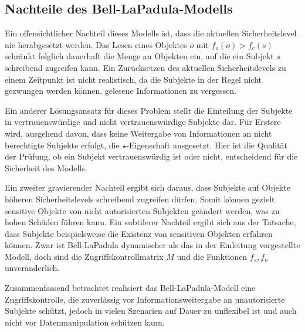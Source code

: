 \subsection{Nachteile des Bell-LaPadula-Modells}
Ein offensichtlicher Nachteil dieses Modells ist, dass die aktuellen Sicherheitslevel nie herabgesetzt werden. Das Lesen eines Objektes \(o\) mit \(f_o(o) > f_c(s)\) schränkt folglich dauerhaft die Menge an Objekten ein, auf die ein Subjekt \(s\) schreibend zugreifen kann. Ein Zurücksetzen des aktuellen Sicherheitslevels zu einem Zeitpunkt ist nicht realistisch, da die Subjekte in der Regel nicht gezwungen werden können, gelesene Informationen zu vergessen.

Ein anderer Lösungsansatz für dieses Problem stellt die Einteilung der Subjekte in vertrauenswürdige und nicht vertrauenswürdige  Subjekte dar. Für Erstere wird, ausgehend davon, dass keine Weitergabe von Informationen an nicht berechtigte Subjekte erfolgt, die \(\star\)-Eigenschaft ausgesetzt. Hier ist die Qualität der Prüfung, ob ein Subjekt vertrauenswürdig ist oder nicht, entscheidend für die Sicherheit des Modells. 

Ein zweiter gravierender Nachteil ergibt sich daraus, dass Subjekte auf Objekte höheren Sicherheitslevels schreibend zugreifen dürfen. Somit können gezielt sensitive Objekte von nicht autorisierten Subjekten geändert werden, was zu hohen Schäden führen kann.
Ein subtilerer Nachteil ergibt sich aus der Tatsache, dass Subjekte beispielsweise die Existenz von sensitiven Objekten erfahren können. %
Zwar ist Bell-LaPadula dynamischer als das in der Einleitung vorgestellte Modell, doch sind die Zugriffskontrollmatrix \(M\) und die Funktionen \(f_s, f_o\) unveränderlich. 

Zusammenfassend betrachtet realisiert das Bell-LaPadula-Modell eine Zugriffskontrolle, die zuverlässig vor Informationsweitergabe an unautorisierte Subjekte schützt, jedoch in vielen Szenarien auf Dauer zu unflexibel ist und auch nicht vor Datenmanipulation schützen kann.

